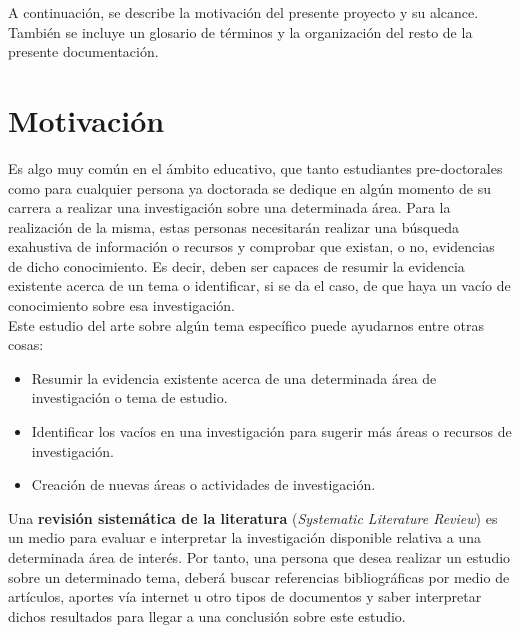 

A continuación, se describe la motivación del presente proyecto y su alcance. También se incluye un glosario de términos y la organización del resto de la presente documentación.

\section{Motivación}
Es algo muy común en el ámbito educativo, que tanto estudiantes pre-doctorales como para cualquier persona ya doctorada se dedique en algún momento de su carrera a realizar una investigación sobre una determinada área. Para la realización de la misma, estas personas necesitarán realizar una búsqueda exahustiva de información o recursos y comprobar que existan, o no, evidencias de dicho conocimiento. Es decir, deben ser capaces de resumir la evidencia existente acerca de un tema o identificar, si se da el caso, de que haya un vacío de conocimiento sobre esa investigación.\\

Este estudio del arte sobre algún tema específico puede ayudarnos entre otras cosas:

\begin{itemize}
\item Resumir la evidencia existente acerca de una determinada área de investigación o tema de estudio.
\item Identificar los vacíos en una investigación para sugerir más áreas o recursos de investigación.
\item Creación de nuevas áreas o actividades de investigación.
\end{itemize}

Una \textbf{revisión sistemática de la literatura} (\textit{Systematic Literature Review}) \cite{ivan2013} es un medio para evaluar e interpretar la investigación disponible relativa a una determinada área de interés. Por tanto, una persona que desea realizar un estudio sobre un determinado tema, deberá buscar referencias bibliográficas por medio de artículos, aportes vía internet u otro tipos de documentos y saber interpretar dichos resultados para llegar a una conclusión sobre este estudio.\\

